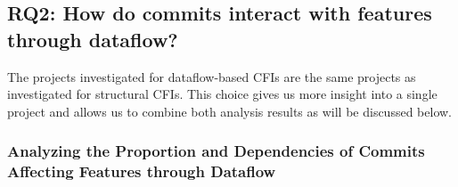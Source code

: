 \subsection*{\textbf{RQ2: How do commits interact with features through dataflow?}}

The projects investigated for dataflow-based CFIs are the same projects as investigated for structural CFIs.
This choice gives us more insight into a single project and allows us to combine both analysis results as will be discussed below.

\subsubsection*{Analyzing the Proportion and Dependencies of Commits Affecting Features through Dataflow}

